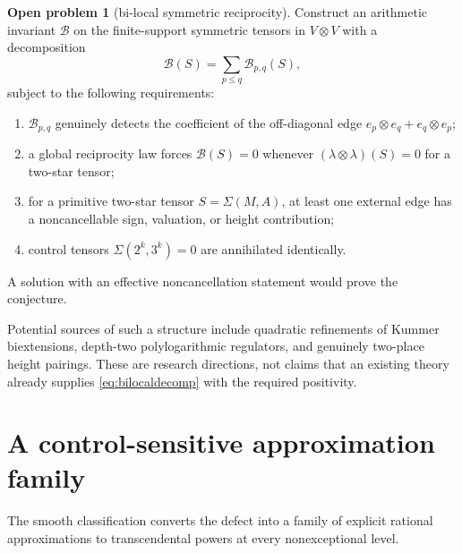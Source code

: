 \documentclass[11pt]{article}
\numberwithin{equation}{section}
\theoremstyle{definition}
\newtheorem{problem}[theorem]{Open problem}
\theoremstyle{remark}
\begin{document}
\begin{problem}[bi-local symmetric reciprocity]\label{prob:bilocal}
Construct an arithmetic invariant $\mathscr B$ on the finite-support symmetric tensors in $V\otimes V$ with a decomposition
\begin{equation}\label{eq:bilocaldecomp}
  \mathscr B(S)=\sum_{p\le q}\mathscr B_{p,q}(S),
\end{equation}
subject to the following requirements:
\begin{enumerate}[label=(\roman*)]
  \item $\mathscr B_{p,q}$ genuinely detects the coefficient of the off-diagonal edge $e_p\otimes e_q+e_q\otimes e_p$;
  \item a global reciprocity law forces $\mathscr B(S)=0$ whenever $(\lambda\otimes\lambda)(S)=0$ for a two-star tensor;
  \item for a primitive two-star tensor $S=\Sigma(M,A)$, at least one external edge has a noncancellable sign, valuation, or height contribution;
  \item control tensors $\Sigma(2^k,3^k)=0$ are annihilated identically.
\end{enumerate}
A solution with an effective noncancellation statement would prove the conjecture.
\end{problem}

Potential sources of such a structure include quadratic refinements of Kummer biextensions, depth-two polylogarithmic regulators, and genuinely two-place height pairings.  These are research directions, not claims that an existing theory already supplies \eqref{eq:bilocaldecomp} with the required positivity.

\section{A control-sensitive approximation family}

The smooth classification converts the defect into a family of explicit rational approximations to transcendental powers at every nonexceptional level.
\end{document}
